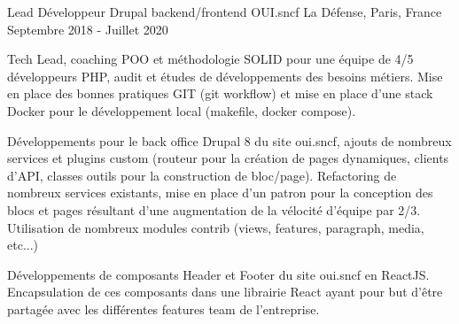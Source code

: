 \cventry
{Lead Développeur Drupal backend/frontend} %
{OUI.sncf} %
{La Défense, Paris, France} %
{Septembre 2018 - Juillet 2020} %
{
\begin{cvitems} %
    \item
    {
        Tech Lead, coaching POO et méthodologie SOLID pour une équipe de 4/5 développeurs PHP, audit et études
        de développements des besoins métiers. Mise en place des bonnes pratiques GIT (git workflow) et mise en place
        d'une stack Docker pour le développement local (makefile, docker compose).
    }
    \item
    {
        Développements pour le back office Drupal 8 du site oui.sncf, ajouts de nombreux services et plugins custom
        (routeur pour la création de pages dynamiques, clients d’API, classes outils pour la construction de bloc/page).
        Refactoring de nombreux services existants, mise en place d’un patron pour la conception des blocs et pages
        résultant d'une augmentation de la vélocité d’équipe par 2/3. Utilisation de nombreux
        modules contrib (views, features, paragraph, media, etc...)
    }
    \item
    {
        Développements de composants Header et Footer du site oui.sncf en ReactJS. Encapsulation de ces composants dans
        une librairie React ayant pour but d’être partagée avec les différentes features team de l’entreprise.
    }
\end{cvitems}
}
